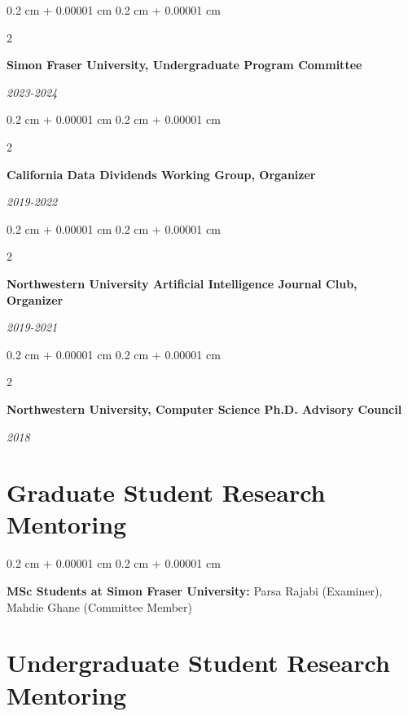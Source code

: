 \documentclass[10pt, letterpaper]{article}
\newenvironment{onecolentry}{
    \begin{adjustwidth}{
        0.2 cm + 0.00001 cm
    }{
        0.2 cm + 0.00001 cm
    }
}{
    \end{adjustwidth}
} %
\newenvironment{twocolentry}[2][]{
    \onecolentry
    \def\secondColumn{#2}
    \setcolumnwidth{\fill, 4.1 cm}
    \begin{paracol}{2}
}{
    \switchcolumn \raggedleft \secondColumn
    \end{paracol}
    \endonecolentry
} %
\begin{document}
        
        \begin{twocolentry}{
            
            
        \textit{2023-2024}}
            \textbf{Simon Fraser University, Undergraduate Program Committee}
        \end{twocolentry}



        \vspace{0.2 cm}

        \begin{twocolentry}{
            
            
        \textit{2019-2022}}
            \textbf{California Data Dividends Working Group, Organizer}
        \end{twocolentry}



        \vspace{0.2 cm}

        \begin{twocolentry}{
            
            
        \textit{2019-2021}}
            \textbf{Northwestern University Artificial Intelligence Journal Club, Organizer}
        \end{twocolentry}



        \vspace{0.2 cm}

        \begin{twocolentry}{
            
            
        \textit{2018}}
            \textbf{Northwestern University, Computer Science Ph.D. Advisory Council}
        \end{twocolentry}




    
    \section{Graduate Student Research Mentoring}



        
        \begin{onecolentry}
            \textbf{MSc Students at Simon Fraser University:} Parsa Rajabi (Examiner), Mahdie Ghane (Committee Member)
        \end{onecolentry}


    
    \section{Undergraduate Student Research Mentoring}
\end{document}
